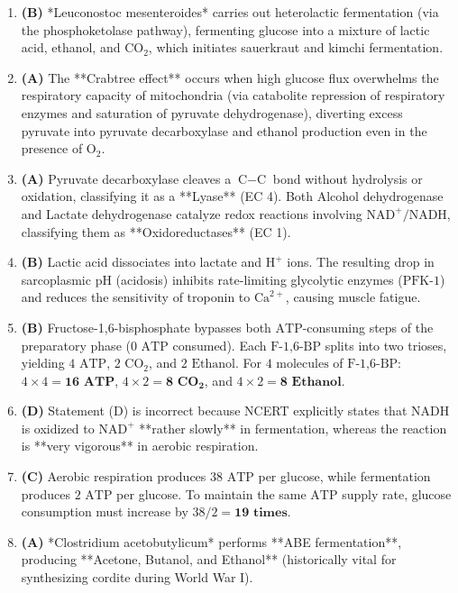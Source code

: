 \documentclass[11pt, a4paper]{article}
\begin{document}
\begin{enumerate}[label=\textbf{\arabic*.}]
\item \textbf{(B)} *Leuconostoc mesenteroides* carries out heterolactic fermentation (via the phosphoketolase pathway), fermenting glucose into a mixture of lactic acid, ethanol, and $\text{CO}_2$, which initiates sauerkraut and kimchi fermentation.

\item \textbf{(A)} The **Crabtree effect** occurs when high glucose flux overwhelms the respiratory capacity of mitochondria (via catabolite repression of respiratory enzymes and saturation of pyruvate dehydrogenase), diverting excess pyruvate into pyruvate decarboxylase and ethanol production even in the presence of $\text{O}_2$.

\item \textbf{(A)} Pyruvate decarboxylase cleaves a $\text{C}-\text{C}$ bond without hydrolysis or oxidation, classifying it as a **Lyase** (EC 4). Both Alcohol dehydrogenase and Lactate dehydrogenase catalyze redox reactions involving $\text{NAD}^+/\text{NADH}$, classifying them as **Oxidoreductases** (EC 1).

\item \textbf{(B)} Lactic acid dissociates into lactate and $\text{H}^+$ ions. The resulting drop in sarcoplasmic pH (acidosis) inhibits rate-limiting glycolytic enzymes ($\text{PFK-1}$) and reduces the sensitivity of troponin to $\text{Ca}^{2+}$, causing muscle fatigue.

\item \textbf{(B)} Fructose-1,6-bisphosphate bypasses both $\text{ATP}$-consuming steps of the preparatory phase ($0\text{ ATP}$ consumed). Each $\text{F-1,6-BP}$ splits into two trioses, yielding $4\text{ ATP}$, $2\text{ CO}_2$, and $2\text{ Ethanol}$. For $4\text{ molecules}$ of $\text{F-1,6-BP}$: $4 \times 4 = \mathbf{16\text{ ATP}}$, $4 \times 2 = \mathbf{8\text{ CO}_2}$, and $4 \times 2 = \mathbf{8\text{ Ethanol}}$.

\item \textbf{(D)} Statement (D) is incorrect because NCERT explicitly states that $\text{NADH}$ is oxidized to $\text{NAD}^+$ **rather slowly** in fermentation, whereas the reaction is **very vigorous** in aerobic respiration.

\item \textbf{(C)} Aerobic respiration produces $38\text{ ATP}$ per glucose, while fermentation produces $2\text{ ATP}$ per glucose. To maintain the same $\text{ATP}$ supply rate, glucose consumption must increase by $38 / 2 = \mathbf{19\text{ times}}$.

\item \textbf{(A)} *Clostridium acetobutylicum* performs **ABE fermentation**, producing **Acetone, Butanol, and Ethanol** (historically vital for synthesizing cordite during World War I).

\end{enumerate}
\end{document}
